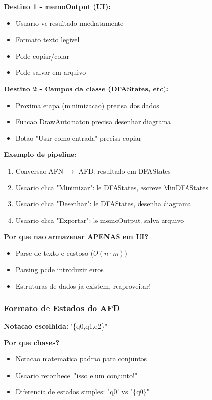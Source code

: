 \documentclass[12pt,a4paper]{article}
\begin{document}
\textbf{Destino 1 - memoOutput (UI):}
\begin{itemize}
    \item Usuario ve resultado imediatamente
    \item Formato texto legivel
    \item Pode copiar/colar
    \item Pode salvar em arquivo
\end{itemize}

\textbf{Destino 2 - Campos da classe (DFAStates, etc):}
\begin{itemize}
    \item Proxima etapa (minimizacao) precisa dos dados
    \item Funcao DrawAutomaton precisa desenhar diagrama
    \item Botao "Usar como entrada" precisa copiar
\end{itemize}

\textbf{Exemplo de pipeline:}
\begin{enumerate}
    \item Conversao AFN $\rightarrow$ AFD: resultado em DFAStates
    \item Usuario clica "Minimizar": le DFAStates, escreve MinDFAStates
    \item Usuario clica "Desenhar": le DFAStates, desenha diagrama
    \item Usuario clica "Exportar": le memoOutput, salva arquivo
\end{enumerate}

\textbf{Por que nao armazenar APENAS em UI?}
\begin{itemize}
    \item Parse de texto e custoso ($O(n \cdot m)$)
    \item Parsing pode introduzir erros
    \item Estruturas de dados ja existem, reaproveitar!
\end{itemize}

\subsubsection{Formato de Estados do AFD}

\textbf{Notacao escolhida:} "\{q0,q1,q2\}"

\textbf{Por que chaves?}
\begin{itemize}
    \item Notacao matematica padrao para conjuntos
    \item Usuario reconhece: "isso e um conjunto!"
    \item Diferencia de estados simples: "q0" vs "\{q0\}"
\end{itemize}
\end{document}

